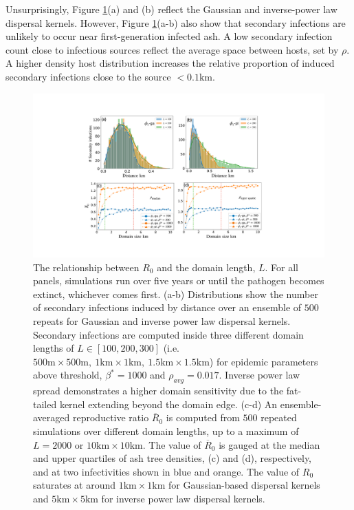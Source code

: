 Unsurprisingly, Figure \ref{fig:r0-domain-size}(a) and (b) reflect the Gaussian and inverse-power law dispersal kernels. 
However, Figure \ref{fig:r0-domain-size}(a-b) also show that secondary infections are unlikely to occur near first-generation infected ash.
A low secondary infection count close to infectious sources reflect the average space between hosts, set by $\rho$.
A higher density host distribution increases the relative proportion of induced secondary infections close to the source $<0.1\mathrm{km}$.

\begin{figure}
    \centering
    \includegraphics[scale=0.42]{chapter6/figures/fig5-R0-domain-size.pdf}
    \caption{The relationship between $R_0$ and the domain length, $L$. 
    For all panels, simulations run over five years or until the pathogen becomes extinct, whichever comes first.
    (a-b) Distributions show the number of secondary infections induced by distance over an ensemble of $500$ repeats for Gaussian and inverse power law dispersal kernels.
    Secondary infections are computed inside three different domain lengths of $L \in [100, 200, 300]$ (i.e. $\mathrm{500m\times500m,\ 1km\times1km,\ 1.5km\times1.5km}$) for epidemic parameters above threshold, $\beta^*=1000$ and $\rho_{avg} = 0.017$. Inverse power law spread demonstrates a higher domain sensitivity due to the fat-tailed kernel extending beyond the domain edge. (c-d) An ensemble-averaged reproductive ratio $\overline{R}_0$ is computed from $500$ repeated simulations over different domain lengths, up to a maximum of $L=2000$ or $\mathrm{10km \times 10km}$. The value of $\overline{R}_0$ is gauged at the median and upper quartiles of ash tree densities, (c) and (d), respectively, and at two infectivities shown in blue and orange. The value of $R_0$ saturates at around $\mathrm{1km\times1km}$ for Gaussian-based dispersal kernels and $\mathrm{5km\times5 km}$ for inverse power law dispersal kernels.}
    
    \label{fig:r0-domain-size}
\end{figure}

